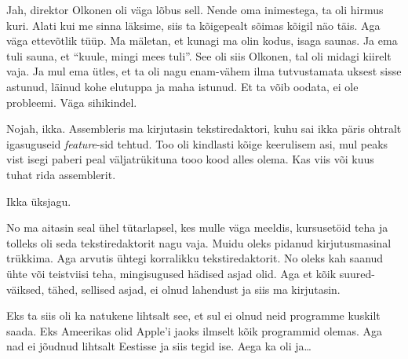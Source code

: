 
Jah, direktor Olkonen oli väga lõbus sell. Nende oma inimestega, ta oli hirmus kuri. Alati kui me sinna läksime, siis ta kõigepealt sõimas kõigil näo täis. Aga väga ettevõtlik tüüp. Ma mäletan, et kunagi ma olin kodus, isaga saunas. Ja ema tuli sauna, et \enquote{kuule, mingi mees tuli}. See oli siis Olkonen, tal oli midagi kiirelt vaja. Ja mul ema ütles, et ta oli nagu enam-vähem ilma tutvustamata uksest sisse astunud, läinud kohe elutuppa ja maha istunud. Et ta võib oodata, ei ole  probleemi. Väga sihikindel. 


Nojah, ikka. Assembleris ma kirjutasin tekstiredaktori, kuhu sai ikka päris ohtralt igasuguseid \emph{feature}-sid tehtud. Too oli kindlasti kõige keerulisem asi, mul peaks vist isegi  paberi peal väljatrükituna tooo kood alles olema. Kas viis  või kuus tuhat rida assemblerit. 


Ikka üksjagu. 


No ma aitasin seal ühel tütarlapsel, kes mulle väga meeldis,  kursusetöid teha ja tolleks oli seda tekstiredaktorit nagu vaja. Muidu oleks pidanud kirjutusmasinal trükkima. Aga arvutis ühtegi korralikku tekstiredaktorit. No oleks kah saanud ühte või teistviisi teha,  mingisugused hädised asjad olid. Aga et kõik suured-väiksed, tähed, sellised asjad, ei olnud lahendust ja siis ma kirjutasin.


Eks ta siis oli ka natukene lihtsalt see, et sul ei olnud neid programme kuskilt saada. Eks Ameerikas olid Apple'i jaoks ilmselt kõik programmid olemas. Aga nad ei jõudnud lihtsalt Eestisse ja siis tegid ise. Aega ka oli ja\ldots


